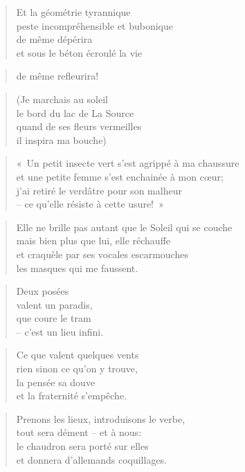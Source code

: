   \begin{verse}
    Et la géométrie tyrannique\\
    peste incompréhensible et bubonique\\
    de même dépérira\\
    et sous le béton écroulé la vie
  \end{verse}
  \begin{verse}
    de même refleurira!
  \end{verse}
  \begin{verse}
    (Je marchais au soleil\\
    le bord du lac de La Source\\
    quand de ses fleurs vermeilles\\
    il inspira ma bouche)
  \end{verse}
  \begin{verse}
    «~Un petit insecte vert s’est agrippé à ma chaussure\\
    et une petite femme s’est enchainée à mon cœur;\\
    j’ai retiré le verdâtre pour son malheur\\
    -- ce qu’elle résiste à cette usure!~»
  \end{verse}
  \begin{verse}
    Elle ne brille pas autant que le Soleil qui se couche\\
    mais bien plus que lui, elle réchauffe\\
    et craquèle par ses vocales escarmouches\\
    les masques qui me faussent.
  \end{verse}
  \begin{verse}
    Deux posées\\
    valent un paradis,\\
    que coure le tram\\
    -- c’est un lieu infini.
  \end{verse}
  \begin{verse}
    Ce que valent quelques vents\\
    rien sinon ce qu’on y trouve,\\
    la pensée sa douve\\
    et la fraternité s’empêche.
  \end{verse}
  \begin{verse}
    Prenons les lieux, introduisons le verbe,\\
    tout sera dément -- et à nous:\\
    le chaudron sera porté sur elles\\
    et donnera d’allemands coquillages.
  \end{verse}
